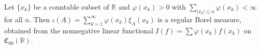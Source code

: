 Let $\{x_k\}$ be a countable subset of $\mathbb{R}$ and $\varphi(x_k) > 0$ with $\sum_{|x_k|\leq n} \varphi(x_k) < \infty$ for all $n$. Then $\iota(A) = \sum_{k=1}^\infty \varphi(x_k) \xi_A(x_k)$ is a regular Borel measure, obtained from the nonnegative linear functional $I(f) = \sum \varphi(x_k) f(x_k)$ on $\mathfrak{C}_{00}(\mathbb{R})$.
